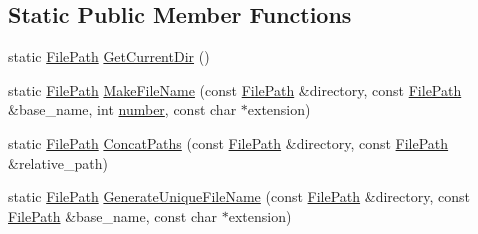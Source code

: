 \subsection*{Static Public Member Functions}
\begin{DoxyCompactItemize}
\item 
static \hyperlink{classtesting_1_1internal_1_1FilePath}{File\-Path} \hyperlink{classtesting_1_1internal_1_1FilePath_a0f7b48e493656679cb82a2b679620c4e}{Get\-Current\-Dir} ()
\item 
static \hyperlink{classtesting_1_1internal_1_1FilePath}{File\-Path} \hyperlink{classtesting_1_1internal_1_1FilePath_a1e7793eaae21c6629afe8be11064b111}{Make\-File\-Name} (const \hyperlink{classtesting_1_1internal_1_1FilePath}{File\-Path} \&directory, const \hyperlink{classtesting_1_1internal_1_1FilePath}{File\-Path} \&base\-\_\-name, int \hyperlink{imgproc__c_8h_a7106e2abc437ad981830d14176d15f09}{number}, const char $\ast$extension)
\item 
static \hyperlink{classtesting_1_1internal_1_1FilePath}{File\-Path} \hyperlink{classtesting_1_1internal_1_1FilePath_ad58aa6d8b160d0ba0b661f56f0980e26}{Concat\-Paths} (const \hyperlink{classtesting_1_1internal_1_1FilePath}{File\-Path} \&directory, const \hyperlink{classtesting_1_1internal_1_1FilePath}{File\-Path} \&relative\-\_\-path)
\item 
static \hyperlink{classtesting_1_1internal_1_1FilePath}{File\-Path} \hyperlink{classtesting_1_1internal_1_1FilePath_ab22637ea53e3918ec814dc6a5fecd1f9}{Generate\-Unique\-File\-Name} (const \hyperlink{classtesting_1_1internal_1_1FilePath}{File\-Path} \&directory, const \hyperlink{classtesting_1_1internal_1_1FilePath}{File\-Path} \&base\-\_\-name, const char $\ast$extension)
\end{DoxyCompactItemize}


